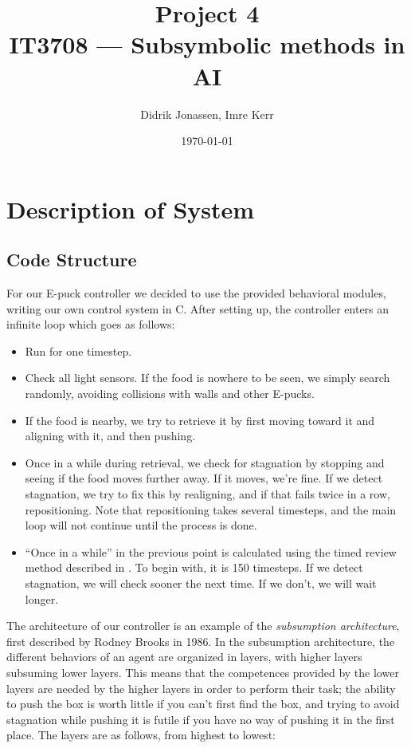 \documentclass[a4paper,12pt]{article}
\author{Didrik Jonassen, Imre Kerr\vspace{-2ex}}
\title{\vspace{-5ex}Project 4\\ IT3708 --- Subsymbolic methods in AI}
\date{\today}
\begin{document}
\maketitle

\section{Description of System}
\subsection{Code Structure}
For our E-puck controller we decided to use the provided behavioral modules, writing our own control system in C. After setting up, the controller enters an infinite loop which goes as follows:
\begin{itemize}
\item{Run for one timestep.}
\item{Check all light sensors. If the food is nowhere to be seen, we simply search randomly, avoiding collisions with walls and other E-pucks.}
\item{If the food is nearby, we try to retrieve it by first moving toward it and aligning with it, and then pushing.}
\item{Once in a while during retrieval, we check for stagnation by stopping and seeing if the food moves further away. If it moves, we're fine. If we detect stagnation, we try to fix this by realigning, and if that fails twice in a row, repositioning. Note that repositioning takes several timesteps, and the main loop will not continue until the process is done.}
\item{``Once in a while'' in the previous point is calculated using the timed review method described in \cite{thesis}. To begin with, it is 150 timesteps. If we detect stagnation, we will check sooner the next time. If we don't, we will wait longer.}
\end{itemize}

The architecture of our controller is an example of the \textit{subsumption architecture}, first described by Rodney Brooks in 1986. In the subsumption architecture, the different behaviors of an agent are organized in layers, with higher layers subsuming lower layers. This means that the competences provided by the lower layers are needed by the higher layers in order to perform their task; the ability to push the box is worth little if you can't first find the box, and trying to avoid stagnation while pushing it is futile if you have no way of pushing it in the first place. The layers are as follows, from highest to lowest:
\end{document}
